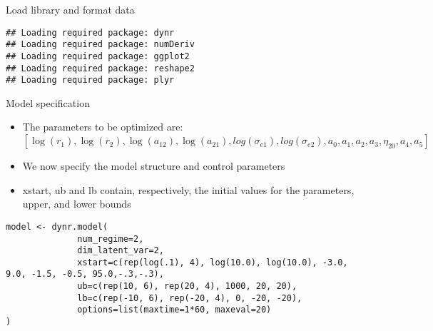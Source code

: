 \begin{frame}[fragile]{Load library and format data}

\begin{Shaded}
\begin{Highlighting}[]
\end{Highlighting}
\end{Shaded}

\begin{verbatim}
## Loading required package: dynr
## Loading required package: numDeriv
## Loading required package: ggplot2
## Loading required package: reshape2
## Loading required package: plyr
\end{verbatim}

\begin{Shaded}
\begin{Highlighting}[]
\StringTok{ }\NormalTok{(}\NormalTok{)}
\StringTok{ }
\StringTok{ }\NormalTok{, }\NormalTok{,}\NormalTok{(}\NormalTok{, }\NormalTok{:}\NormalTok{), }
                  \NormalTok{(}\NormalTok{, }\NormalTok{:}\NormalTok{))}
\end{Highlighting}
\end{Shaded}

\end{frame}

\begin{frame}[fragile]{Model specification}

\begin{itemize}
\itemsep1pt\parskip0pt
\item
  The parameters to be optimized are:
  \([\log(r_1), \log(r_2), \log(a_{12}), \log(a_{21}), log(\sigma_{e1}), log(\sigma_{e2}), a_0, a_1, a_2, a_3, \eta_{20}, a_4, a_5]\)
\item
  We now specify the model structure and control parameters\\
\item
  xstart, ub and lb contain, respectively, the initial values for the
  parameters, upper, and lower bounds
\end{itemize}

\begin{verbatim}
model <- dynr.model(
              num_regime=2,
              dim_latent_var=2,
              xstart=c(rep(log(.1), 4), log(10.0), log(10.0), -3.0, 9.0, -1.5, -0.5, 95.0,-.3,-.3),
              ub=c(rep(10, 6), rep(20, 4), 1000, 20, 20),
              lb=c(rep(-10, 6), rep(-20, 4), 0, -20, -20),
              options=list(maxtime=1*60, maxeval=20)
)
\end{verbatim}

\end{frame}

